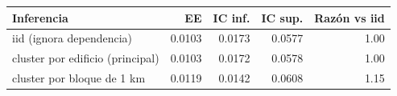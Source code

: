 \begin{tabular}{lrrrr}
\toprule
Inferencia & EE & IC inf. & IC sup. & Razón vs iid \\
\midrule
iid (ignora dependencia) & 0.0103 & 0.0173 & 0.0577 & 1.00 \\
cluster por edificio (principal) & 0.0103 & 0.0172 & 0.0578 & 1.00 \\
cluster por bloque de 1 km & 0.0119 & 0.0142 & 0.0608 & 1.15 \\
\bottomrule
\end{tabular}